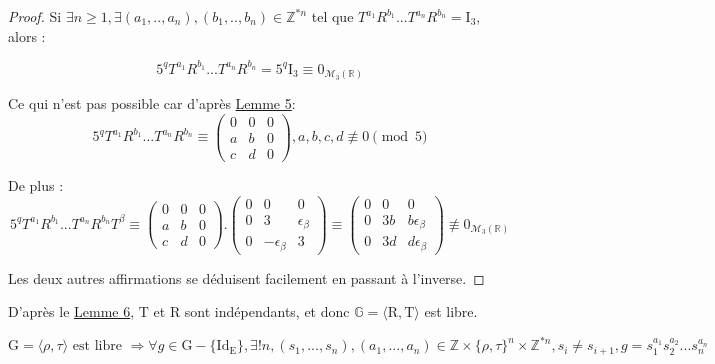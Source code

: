 \begin{proof}
\hfill

Si $\exists n \ge 1,\exists (a_1,..,a_n), (b_1,..,b_n) \in \mathbb{Z}^{*n} $ tel que $T^{a_1}R^{b_1}...T^{a_n}R^{b_n} = \mathrm{I}_3$, alors :\par $$5^qT^{a_1}R^{b_1}...T^{a_n}R^{b_n} = 5^q\mathrm{I}_3 \equiv 0_{\mathcal{M}_3(\mathbb{R})}$$\par
Ce qui n'est pas possible car d'après \hyperref[lemme7]{Lemme 5}: $$5^qT^{a_1}R^{b_1}...T^{a_n}R^{b_n} \equiv  \begin{pmatrix} 0 & 0 & 0 \\ a & b & 0 \\
c  & d & 0 \end{pmatrix}, a,b,c,d \not \equiv 0 \pmod 5$$\par
De plus :$$5^qT^{a_1}R^{b_1}...T^{a_n}R^{b_n}T^\beta \equiv  \begin{pmatrix} 0 & 0 & 0 \\ a & b & 0 \\
c  & d & 0 \end{pmatrix}.\begin{pmatrix}
   0 & 0 & 0 \\
  0 & 3 & \epsilon_\beta \\
 0 & -\epsilon_\beta & 3
\end{pmatrix} \equiv \begin{pmatrix}
   0 & 0 & 0 \\
  0 & 3b & b\epsilon_\beta \\
 0 & 3d &  d\epsilon_\beta
\end{pmatrix} \not \equiv 0_{\mathcal{M}_3(\mathbb{R})}$$
\par
Les deux autres affirmations se déduisent facilement en passant à l'inverse.
\end{proof}
%
\begin{Cor}
  D'après le \hyperref[lemme8]{Lemme 6}, $\mathrm{T}$ et $\mathrm{R}$ sont indépendants, et donc $\mathbb{G} = \langle \mathrm{R}, \mathrm{T} \rangle$ est libre.
\end{Cor}
\begin{prop}\label{prop4}
  $$\mathrm{G} = \langle \rho, \tau \rangle \text{ est libre }\Rightarrow \forall g \in \mathrm{G}-\{\mathrm{Id_E}\}, \exists! n,  (s_1, ..., s_n), (a_1, ..., a_n) \in  \mathbb{Z}\times\{\rho, \tau\}^n \times \mathbb{Z}^{*n},s_i \neq s_{i+1} , g = s_1^{a_1}s_2^{a_2}...s_n^{a_n}$$\par
\end{prop}
